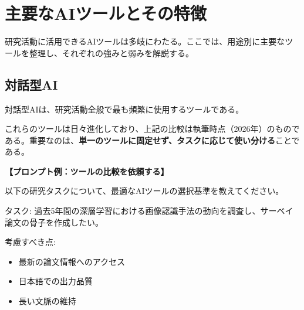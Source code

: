 \section{主要なAIツールとその特徴}
\label{sec:1.2}

研究活動に活用できるAIツールは多岐にわたる。ここでは、用途別に主要なツールを整理し、それぞれの強みと弱みを解説する。

\subsection{対話型AI}

対話型AIは、研究活動全般で最も頻繁に使用するツールである。

\begin{table}[htbp]
\centering
\caption{主要な対話型AIツールの比較}
\label{tab:chatai_comparison}
\end{table}

これらのツールは日々進化しており、上記の比較は執筆時点（2026年）のものである。重要なのは、\textbf{単一のツールに固定せず、タスクに応じて使い分ける}ことである。

\begin{promptbox}
\textbf{【プロンプト例：ツールの比較を依頼する】}

以下の研究タスクについて、最適なAIツールの選択基準を教えてください。

タスク: 過去5年間の深層学習における画像認識手法の動向を調査し、サーベイ論文の骨子を作成したい。

考慮すべき点:
\begin{itemize}
\item 最新の論文情報へのアクセス
\item 日本語での出力品質
\item 長い文脈の維持
\end{itemize}
\end{promptbox}

